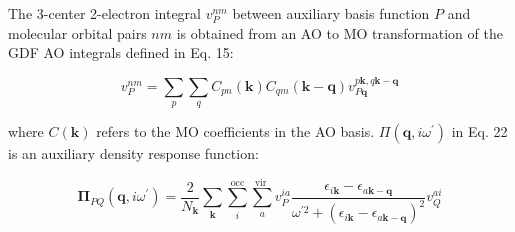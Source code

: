 \documentclass[12pt]{article}
\begin{document}
The 3-center 2-electron integral $v_{P}^{n m}$ between auxiliary basis function $P$ and molecular orbital pairs $n m$ is obtained from an AO to MO transformation of the GDF AO integrals defined in Eq. 15:

\begin{equation*}
v_{P}^{n m}=\sum_{p} \sum_{q} C_{p n}(\mathbf{k}) C_{q m}(\mathbf{k}-\mathbf{q}) v_{P \mathbf{q}}^{p \mathbf{k}, q \mathbf{k}-\mathbf{q}} \tag{23}
\end{equation*}

where $C(\mathbf{k})$ refers to the MO coefficients in the AO basis. $\Pi\left(\mathbf{q}, i \omega^{\prime}\right)$ in Eq. 22 is an auxiliary density response function:

\begin{equation*}
\boldsymbol{\Pi}_{P Q}\left(\mathbf{q}, i \omega^{\prime}\right)=\frac{2}{N_{\mathbf{k}}} \sum_{\mathbf{k}} \sum_{i}^{\mathrm{occ}} \sum_{a}^{\text {vir }} v_{P}^{i a} \frac{\epsilon_{i \mathbf{k}}-\epsilon_{a \mathbf{k}-\mathbf{q}}}{\omega^{\prime 2}+\left(\epsilon_{i \mathbf{k}}-\epsilon_{a \mathbf{k}-\mathbf{q}}\right)^{2}} v_{Q}^{a i} \tag{24}
\end{equation*}
\end{document}
